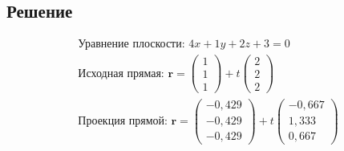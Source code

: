 \documentclass{article}
\begin{document}
\subsection{Решение}
\begin{align*}
\text{Уравнение плоскости: }
4x + 1y + 2z + 3 = 0\\
\text{Исходная прямая: }
\mathbf{r} = \begin{pmatrix}1 \\ 1 \\ 1\end{pmatrix} + t\begin{pmatrix}2 \\ 2 \\ 2\end{pmatrix}\\
\text{Проекция прямой: }
\mathbf{r} = \begin{pmatrix}-0,429 \\ -0,429 \\ -0,429\end{pmatrix} + t\begin{pmatrix}-0,667 \\ 1,333 \\ 0,667\end{pmatrix}\\
\end{align*}
\end{document}

